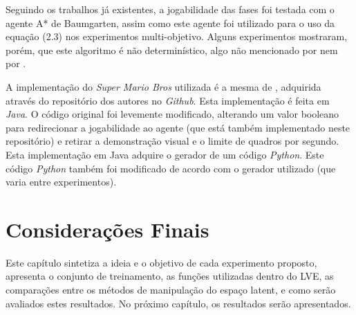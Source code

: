 Seguindo os trabalhos já existentes, a jogabilidade das fases foi testada com o agente A* de Baumgarten, assim como este agente foi utilizado para o uso da equação (2.3) nos experimentos multi-objetivo. Alguns experimentos mostraram, porém, que este algoritmo é não determinístico, algo não mencionado por \citep{marioAI} nem por \citep{marioGAN}.

A implementação do \textit{Super Mario Bros} utilizada é a mesma de \citep{marioAI}, adquirida através do repositório dos autores no \textit{Github}. Esta implementação é feita em \textit{Java}. O código original foi levemente modificado, alterando um valor booleano para redirecionar a jogabilidade ao agente (que está também implementado neste repositório) e retirar a demonstração visual e o limite de quadros por segundo. Esta implementação em Java adquire o gerador de um código \textit{Python}. Este código \textit{Python} também foi modificado de acordo com o gerador utilizado (que varia entre experimentos).

\section{Considerações Finais}

Este capítulo sintetiza a ideia e o objetivo de cada experimento proposto, apresenta o conjunto de treinamento, as funções utilizadas dentro do LVE, as comparações entre os métodos de manipulação do espaço latent, e como serão avaliados estes resultados. No próximo capítulo, os resultados serão apresentados.
